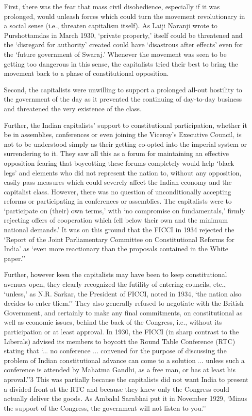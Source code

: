 First, there was the fear that mass civil disobedience, especially if it was prolonged, would unleash forces which could turn the movement revolutionary in a social sense (i.e., threaten capitalism itself). As Laiji Naranji wrote to Purshottamdas in March 1930, `private property,' itself could be threatened and the `disregard for authority' created could have `disastrous after effects' even for the `future government of Swaraj.' Whenever the movement was seen to be getting too dangerous in this sense, the capitalists tried their best to bring the movement back to a phase of constitutional opposition. 

Second, the capitalists were unwilling to support a prolonged all-out hostility to the government of the day as it prevented the continuing of day-to-day business and threatened the very existence of the class. 

Further, the Indian capitalists' support to constitutional participation, whether it be in assemblies, conferences or even joining the Viceroy's Executive Council, is not to be understood simply as their getting co-opted into the imperial system or surrendering to it. They saw all this as a forum for maintaining an effective opposition fearing that boycotting these forums completely would help `black legs' and elements who did not represent the nation to, without any opposition, easily pass measures which could severely affect the Indian economy and the capitalist class. However, there was no question of unconditionally accepting reforms or participating in conferences or assemblies. The capitalists were to `participate on (their) own terms,' with `no compromise on fundamentals,' firmly rejecting offers of cooperation which fell below their own and the minimum national demands.' It was on this ground that the FICCI in 1934 rejected the `Report of the Joint Parliamentary Committee on Constitutional Reforms for India' as `even more reactionary than the proposals contained in the White paper.'' 

Further, however keen the capitalists may have been to keep constitutional avenues open, they clearly recognized the futility of entering councils, etc., `unless,' as N.R. Sarkar, the President of FICCI, noted in 1934, `the nation also decides to enter tliem.'' They also generally refused to negotiate with the British Government, and certainly to make any final commitments, on constitutional as well as economic issues, behind the back of the Congress, i.e., without its participation or at least approval. In 1930, the FICCI (in sharp contrast to the Liberals) advised its members to boycott the Round Table Conference (RTC) stating that `... no conference ... convened for the purpose of discussing the problem of Indian constitutional advance can come to a solution ... unless such a conference is attended by Mahatma Gandhi, as a free man, or has at least his aproval.''3 This was partially because the capitalists did not want India to present a divided front at the RTC and because they knew only the Congress could actually deliver the goods. As Ambalal Sarabhai put it in November 1929, `Minus the support of the Congress, the government will not listen to you.'' 


